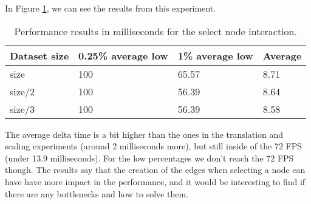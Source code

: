 %
%

In Figure \ref{tab:experiment_select}, we can see the results from this experiment.

\begin{table}[h!]
\centering
\begin{tabular}{llll}
  \hline
Dataset size & 0.25\% average low & 1\% average low & Average \\
\hline
size & 100 & 65.57 & 8.71 \\
size/2 & 100 & 56.39 & 8.64 \\
size/3 & 100 & 56.39 & 8.58 \\
\end{tabular}
\caption{Performance results in milliseconds for the select node interaction.}
\label{tab:experiment_select}
\end{table}

The average delta time is a bit higher than the ones in the translation and scaling experiments (around 2 milliseconds more), but still inside of the 72 FPS (under 13.9 milliseconds). For the low percentages we don't reach the 72 FPS though. The results say that the creation of the edges when selecting a node can have have more impact in the performance, and it would be interesting to find if there are any bottlenecks and how to solve them.

